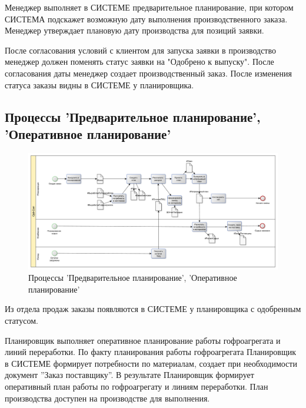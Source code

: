 


Менеджер выполняет в СИСТЕМЕ предварительное планирование, при котором СИСТЕМА подскажет возможную дату выполнения производственного заказа. 
Менеджер  утверждает плановую дату производства для позиций заявки.

После согласования условий с клиентом для запуска заявки в производство менеджер должен поменять статус заявки на "Одобрено к выпуску". После согласования даты менеджер создает производственный заказ. После изменения статуса заказы видны в СИСТЕМЕ у планировщика. 
   
\subsection{Процессы 'Предварительное планирование', 'Оперативное планирование'}
%
\begin{figure}
\begin{center}
  \includegraphics[angle=90, height=0.8\textheight, keepaspectratio]{Pics/3_Планирование и склад материалов.pdf}
\end{center}
  \caption{Процессы 'Предварительное планирование', 'Оперативное планирование'}
  \label{pic:Schema_3}
\end{figure}
\clearpage


Из отдела продаж заказы появляются в СИСТЕМЕ у планировщика с одобренным статусом.

Планировщик выполняет оперативное планирование работы гофроагрегата и линий переработки. По факту планирования работы гофроагрегата Планировщик  в СИСТЕМЕ формирует потребности по материалам, создает при необходимости  документ ''Заказ поставщику''. 
В результате Планировщик формирует оперативный план работы по гофроагрегату и линиям переработки.
План производства доступен на производстве для выполнения.



